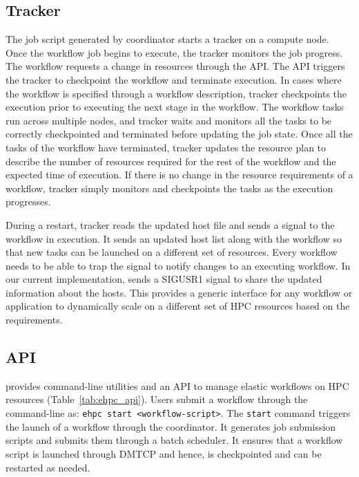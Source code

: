 \subsection{\systemname Tracker}
The job script generated by \systemname coordinator starts a tracker
on a compute node. Once the workflow job begins to execute, the
tracker monitors the job progress. The workflow requests a change in
resources through the \systemname API. The API triggers the 
\systemname tracker to checkpoint the workflow and terminate
execution. In cases where the workflow is specified through a workflow description,
\systemname tracker checkpoints the execution prior to executing the
next stage in the workflow. The workflow tasks run across multiple
nodes, and \systemname tracker waits and monitors all the tasks to be
correctly checkpointed and terminated before updating the job state. Once
all the tasks of the workflow have terminated, \systemname tracker updates
the resource plan to describe the number of resources required for the rest
of the workflow and the expected time of execution. If there is no change in
the resource requirements of a workflow, \systemname tracker simply
monitors and checkpoints the tasks as the execution progresses.

During a restart, \systemname
tracker reads the updated host file and sends a signal to the workflow
in execution. It sends an updated host list along with the workflow
so that new tasks can be launched on a different set of resources. Every
workflow needs to be able to trap the signal to notify changes to
an executing workflow. In our current implementation, \systemname sends
a SIGUSR1 signal to share the updated information about the hosts. This
provides a generic interface for any workflow or application to dynamically
scale on a different set of HPC resources based on the requirements. 



\vspace{-0.3cm}
\subsection{\systemname API}
\label{subsec:api}
\systemname provides command-line utilities and an API to manage elastic
workflows on HPC resources (Table~\ref{tab:ehpc_api}). Users submit a workflow through the command-line
as: \texttt{ehpc start <workflow-script>}.
The \texttt{start} command triggers the launch of a workflow through the
\systemname coordinator. It generates job submission scripts and submits them
through a batch scheduler. It ensures that a workflow script is launched
through DMTCP and hence, is checkpointed and can be restarted as needed.

